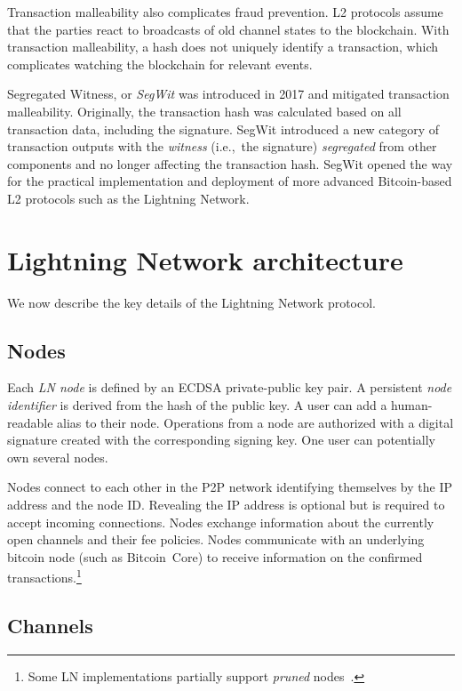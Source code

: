 Transaction malleability also complicates fraud prevention.
L2 protocols assume that the parties react to broadcasts of old channel states to the blockchain.
With transaction malleability, a hash does not uniquely identify a transaction, which complicates watching the blockchain for relevant events.

Segregated Witness, or \textit{SegWit} was introduced in 2017 and mitigated transaction malleability.
Originally, the transaction hash was calculated based on all transaction data, including the signature.
SegWit introduced a new category of transaction outputs with the \textit{witness} (i.e.,~the signature) \textit{segregated} from other components and no longer affecting the transaction hash.
SegWit opened the way for the practical implementation and deployment of more advanced Bitcoin-based L2 protocols such as the Lightning Network.


\section{Lightning Network architecture}
\label{sec:LightningOverview}

We now describe the key details of the Lightning Network protocol.

\subsection{Nodes}

Each \textit{LN node} is defined by an ECDSA private-public key pair.
A persistent \textit{node identifier} is derived from the hash of the public key.
A user can add a human-readable alias to their node.
Operations from a node are authorized with a digital signature created with the corresponding signing key.
One user can potentially own several nodes.

Nodes connect to each other in the P2P network identifying themselves by the IP address and the node ID\@.
Revealing the IP address is optional but is required to accept incoming connections.
Nodes exchange information about the currently open channels and their fee policies.
Nodes communicate with an underlying bitcoin node (such as Bitcoin~Core) to receive information on the confirmed transactions.\footnote{Some LN implementations partially support \textit{pruned} nodes~\cite{LNDInstall}.}


\subsection{Channels}


